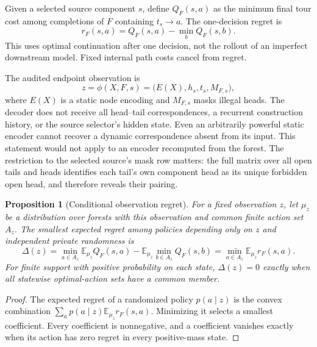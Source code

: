 \documentclass{article}
\newtheorem{proposition}{Proposition}
\newcommand{\E}{\mathbb{E}}
\begin{document}
Given a selected source component $s$, define $Q_F(s,a)$ as the minimum final
tour cost among completions of $F$ containing $t_s\to a$. The one-decision
regret is
\begin{equation}
 r_F(s,a)=Q_F(s,a)-\min_b Q_F(s,b).
\end{equation}
This uses optimal continuation after one decision, not the rollout of an
imperfect downstream model. Fixed internal path costs cancel from regret.

The audited endpoint observation is
\begin{equation}
 z=\phi(X,F,s)=\bigl(E(X),h_s,t_s,M_{F,s}\bigr),
\end{equation}
where $E(X)$ is a static node encoding and $M_{F,s}$ masks illegal heads.
The decoder does not receive all head--tail correspondences, a recurrent
construction history, or the source selector's hidden state. Even an arbitrarily
powerful static encoder cannot recover a dynamic correspondence absent from its
input. This statement would not apply to an encoder recomputed from the forest.
The restriction to the selected source's mask row matters: the full matrix
over all open tails and heads identifies each tail's own component head as
its unique forbidden open head, and therefore reveals their pairing.

\begin{proposition}[Conditional observation regret]
\label{prop:risk}
For a fixed observation $z$, let $\mu_z$ be a distribution over forests with
this observation and common finite action set $A_z$. The smallest expected
regret among policies depending only on $z$ and independent private randomness is
\begin{equation}
 \Delta(z)=\min_{a\in A_z}\E_{\mu_z}Q_F(s,a)
              -\E_{\mu_z}\min_{b\in A_z}Q_F(s,b)
           =\min_{a\in A_z}\E_{\mu_z}r_F(s,a).
 \label{eq:risk}
\end{equation}
For finite support with positive probability on each state, $\Delta(z)=0$
exactly when all statewise optimal-action sets have a common member.
\end{proposition}

\begin{proof}
The expected regret of a randomized policy $p(a\mid z)$ is the convex
combination $\sum_a p(a\mid z)\E_{\mu_z}r_F(s,a)$. Minimizing it selects a
smallest coefficient. Every coefficient is nonnegative, and a coefficient
vanishes exactly when its action has zero regret in every positive-mass state.
\end{proof}
\end{document}
